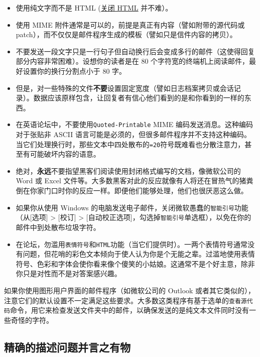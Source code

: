 \documentclass[titlepage]{article}
\begin{document}
\begin{itemize}

\item
  使用纯文字而不是 HTML
  (\href{http://archive.birdhouse.org/etc/evilmail.html}{关闭 HTML}
  并不难）。
\item
  使用 MIME 附件通常是可以的，前提是真正有内容（譬如附带的源代码或
  patch），而不仅仅是邮件程序生成的模板（譬如只是信件内容的拷贝）。
\item
  不要发送一段文字只是一行句子但自动换行后会变成多行的邮件（这使得回复部分内容非常困难）。设想你的读者是在
  80 个字符宽的终端机上阅读邮件，最好设置你的换行分割点小于 80 字。
\item
  但是，对一些特殊的文件\textbf{不要}设置固定宽度（譬如日志档案拷贝或会话记录）。数据应该原样包含，让回复者有信心他们看到的是和你看到的一样的东西。
\item
  在英语论坛中，不要使用\texttt{Quoted-Printable} MIME
  编码发送消息。这种编码对于张贴非 ASCII
  语言可能是必须的，但很多邮件程序并不支持这种编码。当它们处理换行时，那些文本中四处散布的\texttt{=20}符号既难看也分散注意力，甚至有可能破坏内容的语意。
\item
  绝对，\textbf{永远}不要指望黑客们阅读使用封闭格式编写的文档，像微软公司的
  Word 或 Excel
  文件等。大多数黑客对此的反应就像有人将还在冒热气的猪粪倒在你家门口时你的反应一样。即便他们能够处理，他们也很厌恶这么做。
\item
  如果你从使用 Windows
  的电脑发送电子邮件，关闭微软愚蠢的\texttt{智能引号}功能 （从{[}选项{]}
  \textgreater{} {[}校订{]} \textgreater{}
  {[}自动校正选项{]}，勾选掉\texttt{智能引号}单选框），以免在你的邮件中到处散布垃圾字符。
\item
  在论坛，勿滥用\texttt{表情符号}和\texttt{HTML}功能（当它们提供时）。一两个表情符号通常没有问题，但花哨的彩色文本倾向于使人认为你是个无能之辈。过滥地使用表情符号、色彩和字体会使你看来像个傻笑的小姑娘。这通常不是个好主意，除非你只是对性而不是对答案感兴趣。
\end{itemize}

如果你使用图形用户界面的邮件程序（如微软公司的 Outlook
或者其它类似的），注意它们的默认设置不一定满足这些要求。大多数这类程序有基于选单的\texttt{查看源代码}命令，用它来检查发送文件夹中的邮件，以确保发送的是纯文本文件同时没有一些奇怪的字符。

\hypertarget{ux7cbeux786eux7684ux63cfux8ff0ux95eeux9898ux5e76ux8a00ux4e4bux6709ux7269}{\subsection{精确的描述问题并言之有物}\label{ux7cbeux786eux7684ux63cfux8ff0ux95eeux9898ux5e76ux8a00ux4e4bux6709ux7269}}
\end{document}
